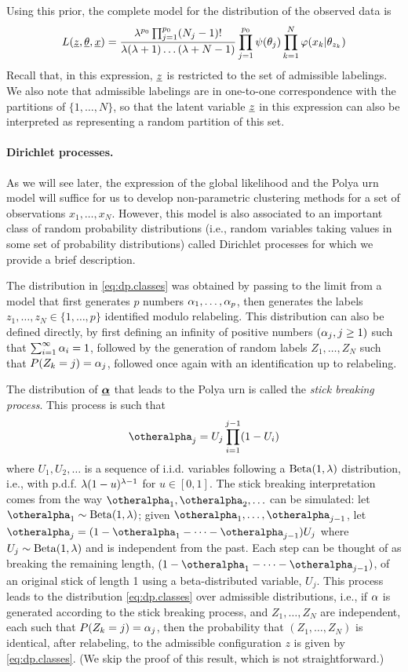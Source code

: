 Using this prior, the complete model for the distribution of the observed data is
\[
L({\underline{z}}, \underline {\theta}, {\underline{x}}) = \frac{\lambda^{p_0} \prod_{j=1}^{p_0} (N_j-1)! }{\lambda (\lambda+1) \ldots (\lambda+N-1)} \prod_{j=1}^{p_0} \psi(\theta_j) \prod_{k=1}^N \varphi(x_k|\theta_{z_k})
\]
Recall that, in this expression, ${\underline{z}}$ is restricted to the set of admissible labelings. We also note that admissible labelings are in one-to-one correspondence with the partitions of $\{1, \ldots, N\}$, so that the latent variable ${\underline{z}}$ in this expression can also be interpreted as representing a random partition of this set. 


\paragraph{Dirichlet processes.}

As we will see later, the expression of the global likelihood and the Polya urn model will suffice for us to develop  non-parametric clustering methods for a set of observations  $x_1, \ldots, x_N$. However, this model is also associated to an important class of random probability distributions (i.e., random variables taking values in some set of probability distributions) called Dirichlet processes for which we provide a brief description.

The distribution in \cref{eq:dp.classes} was obtained by passing to the limit from a  model 
that first generates $p$ numbers $\alpha_1, \ldots, \alpha_p$, then generates the labels $z_1, \ldots, z_N \in \{1, \ldots, p\}$ identified modulo relabeling. This distribution  can also be defined directly, by first defining an infinity of positive numbers $(\alpha_j, j\geq 1)$ such that $\sum_{i=1}^\infty \alpha_i = 1$,  followed by the generation of random labels $Z_1, \ldots, Z_N$ such that $P(Z_k = j) = \alpha_j$, followed once again with an identification up to relabeling.

 The distribution of $\underline{\bm {\alpha}}$ that leads to the Polya urn is called the {\em stick breaking process}. This process is such that
\[
\bfal_j = U_j \prod_{i=1}^{j-1}(1-U_i)
\] 
where $U_1, U_2, \ldots$ is a sequence of i.i.d. variables following a $\mathrm{Beta}(1, \lambda)$ distribution, i.e., with p.d.f. $\lambda (1-u)^{\lambda-1}$ for $u\in [0,1]$. The stick breaking interpretation comes from the way $\bfal_1, \bfal_2, \ldots$ can be simulated: let $\bfal_1 \sim \mathrm{Beta}(1, \la)$; given $\bfal_1, \ldots, \bfal_{j-1}$, let $\bfal_j = (1-\bfal_1 - \cdots - \bfal_{j-1})U_j $ where $U_j \sim \mathrm{Beta}(1, \lambda)$ and is independent from the past. Each step can be thought of as breaking the remaining length, $(1-\bfal_1 - \cdots - \bfal_{j-1})$, of an original stick of length 1 using a beta-distributed variable, $U_j$. This process leads to the distribution \cref{eq:dp.classes} over admissible distributions, i.e., if $\alpha$ is generated according to the stick breaking process, and $Z_1, \ldots, Z_N$ are independent, each such that $P(Z_k=j) = \alpha_j$, then the probability that $(Z_1, \ldots, Z_N)$ is identical, after relabeling, to the admissible configuration $z$ is given by \cref{eq:dp.classes}. (We skip the proof of this result, which is not straightforward.)



